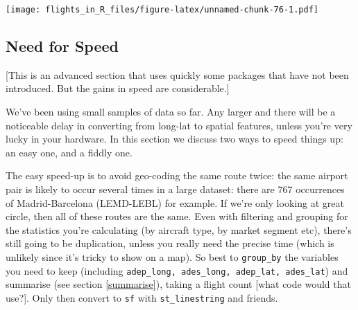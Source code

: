 \documentclass[
]{book}
\newenvironment{Shaded}{\begin{snugshade}}{\end{snugshade}}
\newcommand{\AttributeTok}[1]{\textcolor[rgb]{0.77,0.63,0.00}{#1}}
\newcommand{\CommentTok}[1]{\textcolor[rgb]{0.56,0.35,0.01}{\textit{#1}}}
\newcommand{\DecValTok}[1]{\textcolor[rgb]{0.00,0.00,0.81}{#1}}
\newcommand{\FloatTok}[1]{\textcolor[rgb]{0.00,0.00,0.81}{#1}}
\newcommand{\FunctionTok}[1]{\textcolor[rgb]{0.00,0.00,0.00}{#1}}
\newcommand{\NormalTok}[1]{#1}
\newcommand{\OtherTok}[1]{\textcolor[rgb]{0.56,0.35,0.01}{#1}}
\newcommand{\SpecialCharTok}[1]{\textcolor[rgb]{0.00,0.00,0.00}{#1}}
\newcommand{\StringTok}[1]{\textcolor[rgb]{0.31,0.60,0.02}{#1}}
\begin{document}
\begin{Shaded}
\end{Shaded}

\texttt{[image: flights\_in\_R\_files/figure-latex/unnamed-chunk-76-1.pdf]}

\hypertarget{fasterGeo}{%
\subsection{Need for Speed}\label{fasterGeo}}

{[}This is an advanced section that uses quickly some packages that have not been introduced. But the gains in speed are considerable.{]}

We've been using small samples of data so far. Any larger and there will be a noticeable delay in converting from long-lat to spatial features, unless you're very lucky in your hardware. In this section we discuss two ways to speed things up: an easy one, and a fiddly one.

The easy speed-up is to avoid geo-coding the same route twice: the same airport pair is likely to occur several times in a large dataset: there are 767 occurrences of Madrid-Barcelona (LEMD-LEBL) for example. If we're only looking at great circle, then all of these routes are the same. Even with filtering and grouping for the statistics you're calculating (by aircraft type, by market segment etc), there's still going to be duplication, unless you really need the precise time (which is unlikely since it's tricky to show on a map). So best to \texttt{group\_by} the variables you need to keep (including \texttt{adep\_long,\ ades\_long,\ adep\_lat,\ ades\_lat}) and summarise (see section \ref{summarise}), taking a flight count {[}what code would that use?{]}. Only then convert to \texttt{sf} with \texttt{st\_linestring} and friends.
\end{document}
